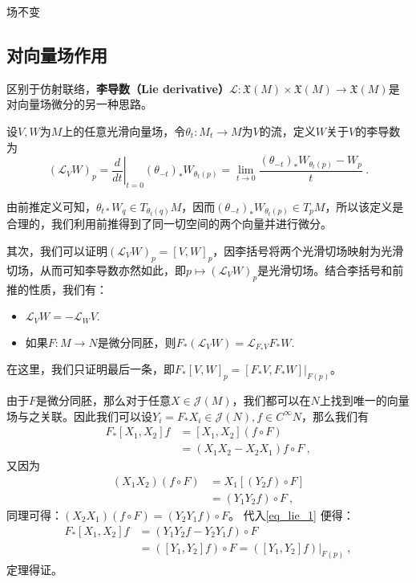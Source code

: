 
\begin{issues}
\issueTODO 场不变
\end{issues}
\subsection{对向量场作用}
区别于仿射联络，\textbf{李导数（Lie derivative）}$\mathcal{L}:\mathfrak{X}(M)\times\mathfrak{X}(M)\to\mathfrak{X}(M)$是对向量场微分的另一种思路。

\begin{definition}{}
设$V,W$为$M$上的任意光滑向量场，令$\theta_t:M_t\rightarrow M$为$V$的流，定义$W$关于$V$的李导数为
\begin{equation}(\mathcal{L}_VW)_p=\left.\frac{d}{dt}\right|_{t=0}(\theta_{-t})_*W_{\theta_t(p)}=\lim_{t\to0}\frac{(\theta_{-t})_*W_{\theta_t(p)}-W_p}{t}~.\end{equation}
\end{definition}
由前推定义可知，$\theta_{t*}W_q\in T_{\theta_t(q)}M$，因而$(\theta_{-t})_*W_{\theta_t(p)}\in T_p M$，所以该定义是合理的，我们利用前推得到了同一切空间的两个向量并进行微分。

其次，我们可以证明$(\mathcal{L}_VW)_p=[V,W]_p$，因李括号将两个光滑切场映射为光滑切场，从而可知李导数亦然如此，即$p\mapsto(\mathcal{L}_VW)_p$是光滑切场。结合李括号和前推的性质，我们有：
\begin{theorem}{}
\begin{itemize}
\item $\mathcal{L}_VW=-\mathcal{L}_WV.$
\item 如果$F:M\rightarrow N$是微分同胚，则$F_*(\mathcal{L}_VW)=\mathcal{L}_{F_*V}F_*W.$
\end{itemize}
\end{theorem}
在这里，我们只证明最后一条，即$F_*[V,W]_{p}=[F_*V,F_*W]|_{F(p)}$。

由于$F$是微分同胚，那么对于任意$X\in \mathcal J(M)$，我们都可以在$N$上找到唯一的向量场与之关联。因此我们可以设$Y_i=F_*X_i\in \mathcal J(N),f\in C^{\infty}N$，那么我们有
\begin{equation}\label{eq_lie_1}
\begin{aligned}
F_*[X_1,X_2]f&=[X_1,X_2](f\circ F)\\
&=(X_1X_2-X_2X_1)f\circ F~,
\end{aligned}
\end{equation}
又因为
\begin{equation}
\begin{aligned}
(X_1X_2)(f\circ F)&=X_1[(Y_2f)\circ F]\\
&=(Y_1Y_2f)\circ F~,
\end{aligned}
\end{equation}
同理可得：$(X_2X_1)(f\circ F)=(Y_2Y_1f)\circ F$。
代入\autoref{eq_lie_1} 便得：
\begin{equation}
\begin{aligned}
F_*[X_1,X_2]f&=(Y_1Y_2f-Y_2Y_1f)\circ F\\
&=([Y_1,Y_2]f)\circ F=([Y_1,Y_2]f)|_{F(p)}~,
\end{aligned}
\end{equation}
定理得证。

